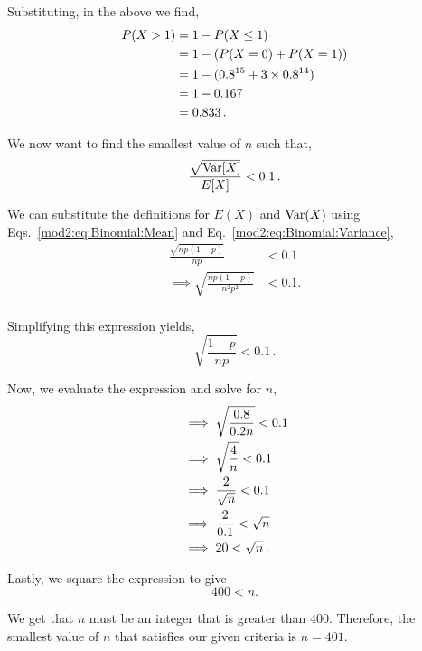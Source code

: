 \begin{subquestions}
\begin{subsubquestions}
   Substituting, in the above we find,
   \begin{align}
   	P(X>1)&=1-P(X\leq1) \nonumber \\
   	&=1-(P(X=0)+P(X=1)) \nonumber \\
   	&=1-(0.8^{15}+3\times0.8^{14}) \nonumber \\
   	&=1- 0.167 \nonumber \\
   	&=0.833 \, .
   \end{align}

   \subsubquestion

   We now want to find the smallest value of $n$ such that,
   \begin{equation}
   	\frac{\sqrt{\text{Var}[X]}}{E[X]}< 0.1 \,. 
   \end{equation}

   We can substitute the definitions for $E(X)$ and $\text{Var}(X)$ using Eqs.~\ref{mod2:eq:Binomial:Mean} and Eq.~\ref{mod2:eq:Binomial:Variance},
   \begin{align}
   	\frac{\sqrt{np(1-p)}}{np}&<0.1 \\
       \implies \sqrt{\frac{np(1-p)}{n^2p^2}}&<0.1.  \\ 
   \end{align}

   Simplifying this expression yields,
   \begin{equation}
   	\sqrt{\frac{1-p}{np}}<0.1 \, .
   \end{equation}

   Now, we evaluate the expression and solve for $n$,
   \begin{align}
   		&\implies \sqrt{\frac{0.8}{0.2n}}<0.1 \nonumber \\
   		&\implies \sqrt{\frac{4}{n}}<0.1 \nonumber \\
   		&\implies \frac{2}{\sqrt{n}}<0.1 \nonumber \\
   		&\implies \frac{2}{0.1}<\sqrt{n} \nonumber \\
   		&\implies 20<\sqrt{n}\, . 
   \end{align}

   Lastly, we square the expression to give
   \begin{equation}
   	400<n.  
   \end{equation}

   We get that $n$ must be an integer that is greater than $400$. Therefore, the smallest value of $n$ that satisfies our given criteria is $n=401$.
\end{subsubquestions}  


\end{subquestions}
